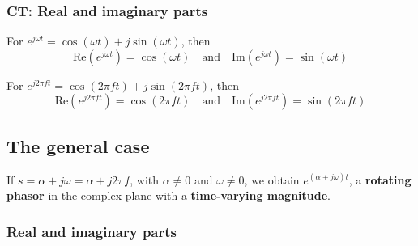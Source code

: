     \subsubsection{CT: Real and imaginary parts}
    \begin{definition}
        For $e^{j\omega t} = \cos(\omega t) + j \sin(\omega t)$, then 
        \begin{equation}
            \text{Re}(e^{j\omega t}) = \cos(\omega t) \quad \text{and} \quad \text{Im}(e^{j\omega t}) = \sin(\omega t)
        \end{equation}

        For $e^{j 2\pi f t} = \cos(2\pi f t) + j \sin(2\pi f t)$, then 
        \begin{equation}
            \text{Re}(e^{j 2\pi f t}) = \cos(2\pi f t) \quad \text{and} \quad \text{Im}(e^{j 2\pi f t}) = \sin(2\pi f t)
        \end{equation}
        
    \end{definition}

\subsection{The general case}
\begin{definition}
    If \(s = \alpha + j\omega = \alpha + j 2\pi f\), with \(\alpha \neq 0\) and \(\omega \neq 0\), we obtain \(e^{(\alpha + j\omega)t}\), a \textbf{rotating phasor} in the complex plane with a \textbf{time-varying magnitude}.
\end{definition}

    \subsubsection{Real and imaginary parts}
    \begin{definition}
    \end{definition}

